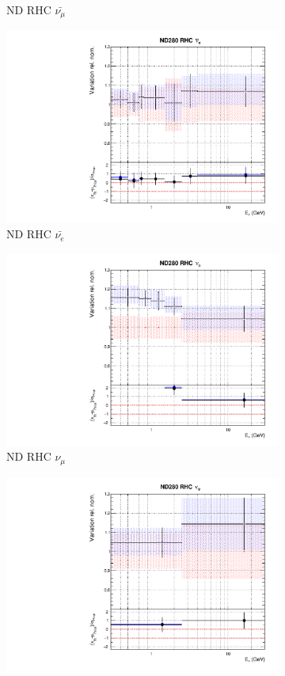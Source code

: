 \begin{figure}
\begin{subfigure}{0.24\textwidth}
  \caption{ND RHC $\bar{\nu_{\mu}}$}
\end{subfigure}
\begin{subfigure}{0.24\textwidth}
  \centering
  \includegraphics[width=0.95\linewidth]{figs/fixed2p2hflux5}
  \caption{ND RHC $\bar{\nu_{e}}$}
\end{subfigure}
\begin{subfigure}{0.24\textwidth}
  \centering
  \includegraphics[width=0.95\linewidth]{figs/fixed2p2hflux6}
  \caption{ND RHC $\nu_{\mu}$}
\end{subfigure}
\vspace{15mm}
\begin{subfigure}{0.24\textwidth}
  \centering
  \includegraphics[width=0.95\linewidth]{figs/fixed2p2hflux7}

\end{subfigure}
\end{figure}
